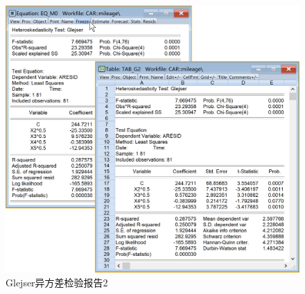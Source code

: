 \documentclass[12pt,(landscape,a4paper),(portrait,a4paper)]{article}
\begin{document}
\begin{figure}

{\centering \includegraphics[width=28.96in]{picture/lab6-heteroskedasticity/4-test-G2-2} 

}

\caption{Glejser异方差检验报告2}\label{fig:fig-G2-report}
\end{figure}
\end{document}
